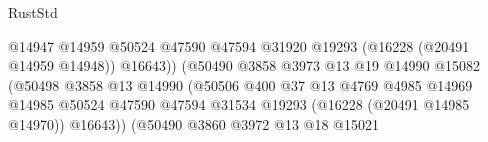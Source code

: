 \begin{lexlean}{RustStd}
\begin{coremodule}
                                                        @14947
                                                        @14959
                                                        @50524
                                                        @47590
                                                        @47594
                                                        @31920
                                                        @19293
                                                        (@16228 (@20491 @14959 @14948))
                                                        @16643))
                                                    (@50490
                                                      @3858
                                                      @3973
                                                      @13
                                                      @19
                                                      @14990
                                                      @15082
                                                      (@50498
                                                        @3858
                                                        @13
                                                        @14990
                                                        (@50506
                                                          @400
                                                          @37
                                                          @13
                                                          @4769
                                                          @4985
                                                          @14969
                                                          @14985
                                                          @50524
                                                          @47590
                                                          @47594
                                                          @31534
                                                          @19293
                                                          (@16228 (@20491 @14985 @14970))
                                                          @16643))
                                                      (@50490
                                                        @3860
                                                        @3972
                                                        @13
                                                        @18
                                                        @15021

\end{coremodule}
\end{lexlean}
